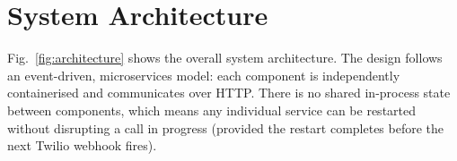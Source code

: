 \documentclass[conference]{IEEEtran}
\begin{document}
\section{System Architecture}
\label{sec:arch}

Fig.~\ref{fig:architecture} shows the overall system architecture. The design
follows an event-driven, microservices model: each component is independently
containerised and communicates over HTTP. There is no shared in-process state
between components, which means any individual service can be restarted without
disrupting a call in progress (provided the restart completes before the next
Twilio webhook fires).
\end{document}
